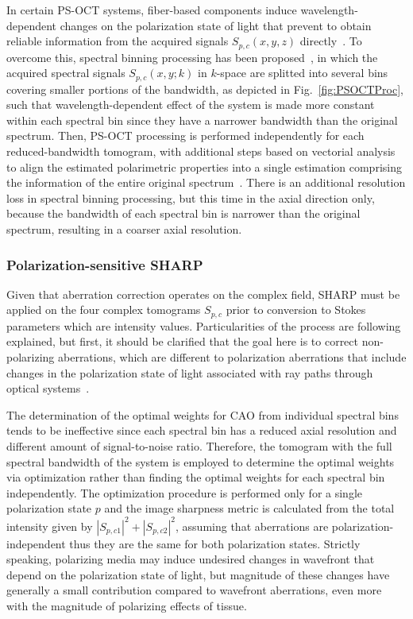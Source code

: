 In certain PS-OCT systems, fiber-based components induce wavelength-dependent changes on the polarization state of light that prevent to obtain reliable information from the acquired signals $S_{p,c}(x,y,z)$ directly~\cite{deBoer2017_Polarization}. To overcome this, spectral binning processing has been proposed~\cite{Villiger2013_Spectral}, in which the acquired spectral signals $S_{p,c}(x,y;k)$ in $k$-space are splitted into several bins covering smaller portions of the bandwidth, as depicted in Fig.~\ref{fig:PSOCTProc}, such that wavelength-dependent effect of the system is made more constant within each spectral bin since they have a narrower bandwidth than the original spectrum. Then, PS-OCT processing is performed independently for each reduced-bandwidth tomogram, with additional steps based on vectorial analysis to align the estimated polarimetric properties into a single estimation comprising the information of the entire original spectrum~\cite{Villiger2013_Spectral}. There is an additional resolution loss in spectral binning processing, but this time in the axial direction only, because the bandwidth of each spectral bin is narrower than the original spectrum, resulting in a coarser axial resolution.

\subsubsection{Polarization-sensitive SHARP}

Given that aberration correction operates on the complex field, SHARP must be applied on the four complex tomograms $S_{p,c}$ prior to conversion to Stokes parameters which are intensity values. Particularities of the process are following explained, but first, it should be clarified that the goal here is to correct non-polarizing aberrations, which are different to polarization aberrations that include changes in the polarization state of light associated with ray paths through optical systems~\cite{Chipman1989_Polarization}.

The determination of the optimal weights for CAO from individual spectral bins tends to be ineffective since each spectral bin has a reduced axial resolution and different amount of signal-to-noise ratio. Therefore, the tomogram with the full spectral bandwidth of the system is employed to determine the optimal weights via optimization rather than finding the optimal weights for each spectral bin independently. The optimization procedure is performed only for a single polarization state $p$ and the image sharpness metric is calculated from the total intensity given by $|S_{p,c1}|^2 + |S_{p,c2}|^2$, assuming that aberrations are polarization-independent thus they are the same for both polarization states. Strictly speaking, polarizing media may induce undesired changes in wavefront that depend on the polarization state of light, but magnitude of these changes have generally a small contribution compared to wavefront aberrations, even more with the magnitude of polarizing effects of tissue.

